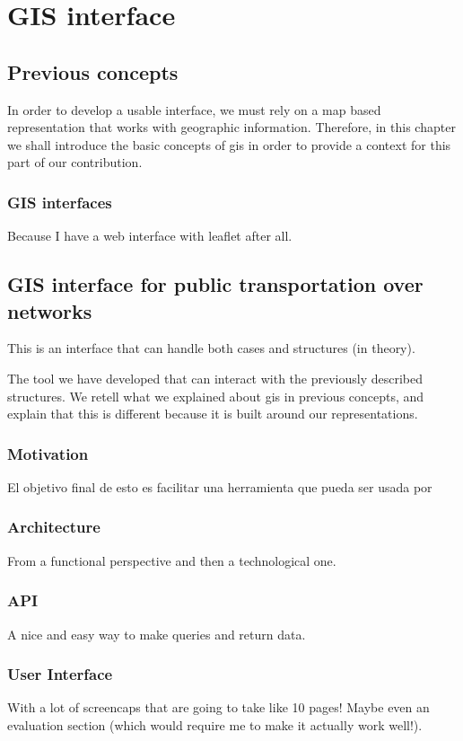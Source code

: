 \documentclass[a4paper,10pt,twoside]{book}
\begin{document}
\part{GIS interface}
\chapter{Previous concepts}
    In order to develop a usable interface, we must rely on a map based representation that works with geographic information. Therefore, in this chapter we shall introduce the basic concepts of \gls{gis} in order to provide a context for this part of our contribution.

    \section{GIS interfaces}
	Because I have a web interface with leaflet after all.

	\chapter{GIS interface for public transportation over networks}
	This is an interface that can handle both cases and structures (in theory).
	
	The tool we have developed that can interact with the previously described structures. We retell what we explained about \gls{gis} in previous concepts, and explain that this is different because it is built around our representations.
	
	\section{Motivation}
	El objetivo final de esto es facilitar una herramienta que pueda ser usada por 
	
	\section{Architecture}
	From a functional perspective and then a technological one.
	
	\section{API}
	A nice and easy way to make queries and return data.
	
	\section{User Interface}
	With a lot of screencaps that are going to take like 10 pages! Maybe even an evaluation section (which would require me to make it actually work well!).
	
\end{document}
